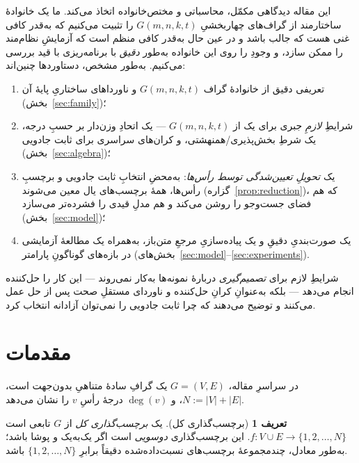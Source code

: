 \documentclass[11pt,a4paper]{article}
\newcommand{\en}[1]{\lr{{\enfont #1}}}
\newcommand{\Gfam}{G(m,n,k,t)}
\DeclareMathOperator{\degr}{deg}
\theoremstyle{plain}
\theoremstyle{definition}
\newtheorem{definition}{تعریف}
\theoremstyle{remark}
\begin{document}
این مقاله دیدگاهی مکمّل، محاسباتی و مختص‌خانواده اتخاذ می‌کند. ما یک خانوادهٔ
ساختارمند از گراف‌های چهاربخشیِ $\Gfam$ را تثبیت می‌کنیم که به‌قدر کافی غنی هست که
جالب باشد و در عین حال به‌قدر کافی منظم است که آزمایشِ نظام‌مند را ممکن سازد، و وجودِ
\en{EMTL} را روی این خانواده به‌طور \emph{دقیق} با برنامه‌ریزی با قید بررسی می‌کنیم.
به‌طور مشخص، دستاوردها چنین‌اند:

\begin{enumerate}[label=(\arabic*),itemsep=1pt]
  \item تعریفی دقیق از خانوادهٔ گراف $\Gfam$ و ناورداهای ساختاریِ پایهٔ آن
        (بخش~\ref{sec:family})؛
  \item شرایطِ \emph{لازمِ} جبری برای یک \en{EMTL} از $\Gfam$ --- یک اتحادِ وزن‌دار بر
        حسبِ درجه، یک شرطِ بخش‌پذیری/همنهشتی، و کران‌های سراسری برای ثابت جادویی
        (بخش~\ref{sec:algebra})؛
  \item یک \emph{تحویلِ تعیین‌شدگی توسط رأس‌ها}: به‌محضِ انتخابِ ثابت جادویی و برچسبِ
        رأس‌ها، همهٔ برچسب‌های یال معین می‌شوند (گزاره~\ref{prop:reduction})، که هم
        فضای جست‌وجو را روشن می‌کند و هم مدلِ قیدی را فشرده‌تر می‌سازد
        (بخش~\ref{sec:model})؛
  \item یک صورت‌بندیِ دقیقِ \en{CP-SAT} و یک پیاده‌سازیِ مرجعِ متن‌باز، به‌همراه یک
        مطالعهٔ آزمایشی در بازه‌های گوناگونِ پارامتر
        (بخش‌های~\ref{sec:model}--\ref{sec:experiments}).
\end{enumerate}

شرایطِ لازم برای \emph{تصمیم‌گیری} دربارهٔ نمونه‌ها به‌کار نمی‌روند --- این کار را
حل‌کننده انجام می‌دهد --- بلکه به‌عنوانِ کرانِ حل‌کننده و ناوردای مستقلِ صحت پس از حل
عمل می‌کنند و توضیح می‌دهند که چرا ثابت جادویی را نمی‌توان آزادانه انتخاب کرد.

\section{مقدمات}\label{sec:prelim}

در سراسرِ مقاله، $G=(V,E)$ یک گرافِ سادهٔ متناهیِ بدون‌جهت است،
$N:=|V|+|E|$، و $\degr(v)$ درجهٔ رأسِ $v$ را نشان می‌دهد.

\begin{definition}[برچسب‌گذاری کل]
یک \emph{برچسب‌گذاری کل} از $G$ تابعی است $f\colon V\cup E\to\{1,2,\dots,N\}$. این
برچسب‌گذاری \emph{دوسویی} است اگر یک‌به‌یک و پوشا باشد؛ به‌طور معادل، چندمجموعهٔ
برچسب‌های نسبت‌داده‌شده دقیقاً برابرِ $\{1,2,\dots,N\}$ باشد.
\end{definition}
\end{document}
